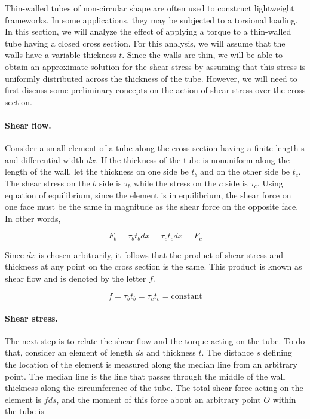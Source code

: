 \documentclass[
fontsize=10pt,
a4paper,
twosides=false,
open=any,
svgnames,
]{kaobook} %
\begin{document}
Thin-walled tubes of non-circular shape are often used to construct lightweight frameworks. In some applications, they may be subjected to a torsional loading. In this section, we will analyze the effect of applying a torque to a thin-walled tube having a closed cross section. For this analysis, we will assume that the walls have a variable thickness $t$. Since the walls are thin, we will be able to obtain an approximate solution for the shear stress by assuming that this stress is uniformly distributed across the thickness of the tube. However, we will need to first discuss some preliminary concepts on the action of shear stress over the cross section.

\paragraph{Shear flow.} Consider a small element of a tube along the cross section having a finite length s and differential width $dx$. If the thickness of the tube is nonuniform along the length of the wall, let the thickness on one side be $t_b$ and on the other side be $t_c$. The shear stress on the $b$ side is $\tau_b$ while the stress on the $c$ side is $\tau_c$. Using equation of equilibrium, since the element is in equilibrium, the shear force on one face must be the same in magnitude as the shear force on the opposite face. In other words,

\[F_b = \tau_bt_bdx = \tau_ct_cdx = F_c\]

Since $dx$ is chosen arbitrarily, it follows that the product of shear stress and thickness at any point on the cross section is the same. This product is known as shear flow and is denoted by the letter $f$.

\begin{equation}
  f = \tau_bt_b = \tau_ct_c = \text{constant}
\end{equation}

\paragraph{Shear stress.} The next step is to relate the shear flow and the torque acting on the tube. To do that, consider an element of length $ds$ and thickness $t$. The distance $s$ defining the location of the element is measured along the median line from an arbitrary point. The median line is the line that passes through the middle of the wall thickness along the circumference of the tube.
The total shear force acting on the element is $fds$, and the moment of this force about an arbitrary point $O$ within the tube is
\end{document}
